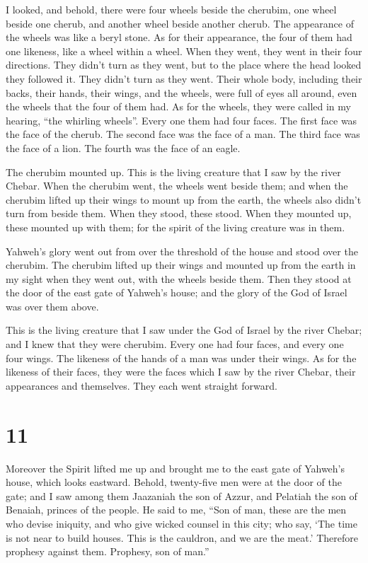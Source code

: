  I looked, and behold, there were four wheels beside the
cherubim, one wheel beside one cherub, and another wheel beside another
cherub. The appearance of the wheels was like a beryl stone.
 As for their appearance, the four of them had one
likeness, like a wheel within a wheel.  When they went,
they went in their four directions. They didn't turn as they went, but
to the place where the head looked they followed it. They didn't turn as
they went.  Their whole body, including their backs, their
hands, their wings, and the wheels, were full of eyes all around, even
the wheels that the four of them had.  As for the wheels,
they were called in my hearing, ``the whirling wheels''. 
Every one them had four faces. The first face was the face of the
cherub. The second face was the face of a man. The third face was the
face of a lion. The fourth was the face of an eagle.

 The cherubim mounted up. This is the living creature that
I saw by the river Chebar.  When the cherubim went, the
wheels went beside them; and when the cherubim lifted up their wings to
mount up from the earth, the wheels also didn't turn from beside them.
 When they stood, these stood. When they mounted up, these
mounted up with them; for the spirit of the living creature was in them.

 Yahweh's glory went out from over the threshold of the
house and stood over the cherubim.  The cherubim lifted up
their wings and mounted up from the earth in my sight when they went
out, with the wheels beside them. Then they stood at the door of the
east gate of Yahweh's house; and the glory of the God of Israel was over
them above.

 This is the living creature that I saw under the God of
Israel by the river Chebar; and I knew that they were cherubim.
 Every one had four faces, and every one four wings. The
likeness of the hands of a man was under their wings.  As
for the likeness of their faces, they were the faces which I saw by the
river Chebar, their appearances and themselves. They each went straight
forward.

\hypertarget{section-9}{%
\section{11}\label{section-9}}

 Moreover the Spirit lifted me up and brought me to the east
gate of Yahweh's house, which looks eastward. Behold, twenty-five men
were at the door of the gate; and I saw among them Jaazaniah the son of
Azzur, and Pelatiah the son of Benaiah, princes of the people.
 He said to me, ``Son of man, these are the men who devise
iniquity, and who give wicked counsel in this city;  who
say, `The time is not near to build houses. This is the cauldron, and we
are the meat.'  Therefore prophesy against them. Prophesy,
son of man.''

